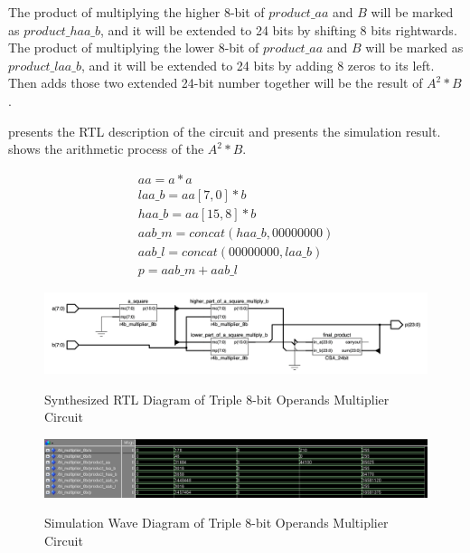 The product of multiplying the higher 8-bit of \(product\_aa\) and \(B\) will be marked as \(product\_haa\_b\), and it will be extended to 24 bits by shifting 8 bits rightwards.
The product of multiplying the lower 8-bit of \(product\_aa\) and \(B\) will be marked as \(product\_laa\_b\), and it will be extended to 24 bits by adding 8 zeros to its left.
Then adds those two extended 24-bit number together will be the result of \textbf{\(A^2 \ast B\)}.

 presents the RTL description of the circuit and  presents the simulation result.
 shows the arithmetic process of the \textbf{\(A^2 \ast B\)}.

\begin{equation}
	\begin{array}{c}
		aa = a \ast a                     \\
		laa\_b = aa[7, 0] \ast b          \\
		haa\_b = aa[15, 8] \ast b         \\
		aab\_m = concat(haa\_b, 00000000) \\
		aab\_l = concat(00000000, laa\_b) \\
		p = aab\_m + aab\_l
	\end{array}
	\label{exp:tri}
\end{equation}

\begin{figure}[!ht]
	\centering
	\caption{Synthesized RTL Diagram of Triple 8-bit Operands Multiplier Circuit}
	\includegraphics[width=\textwidth]{../img/tri_rtl.png}
	\label{fig:tri_rtl}
\end{figure}

\begin{figure}[!ht]
	\centering
	\caption{Simulation Wave Diagram of Triple 8-bit Operands Multiplier Circuit}
	\includegraphics[width=\textwidth]{../img/tri_sim.png}
	\label{fig:tri_sim}
\end{figure}

